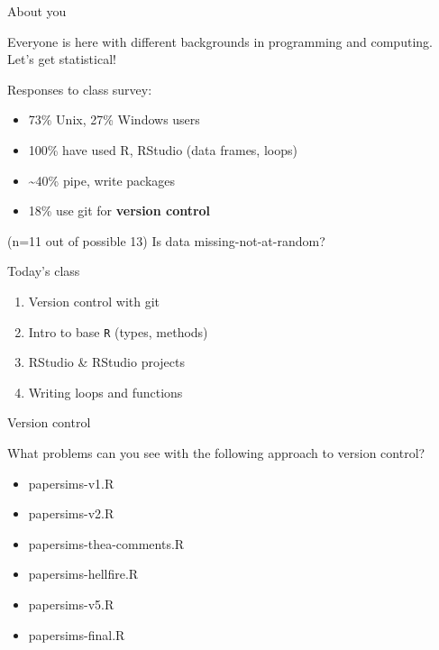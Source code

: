 \documentclass[ignorenonframetext,]{beamer}
\providecommand{\tightlist}{%
  \setlength{\itemsep}{0pt}\setlength{\parskip}{0pt}}
\begin{document}
\begin{frame}{About you}
\protect\hypertarget{about-you}{}

Everyone is here with different backgrounds in programming and
computing. Let's get statistical!

Responses to class survey:

\begin{itemize}
\tightlist
\item
  73\% Unix, 27\% Windows users
\item
  100\% have used R, RStudio (data frames, loops)
\item
  \textasciitilde{}40\% pipe, write packages
\item
  18\% use git for \textbf{version control}
\end{itemize}

(n=11 out of possible 13) Is data missing-not-at-random?

\end{frame}

\begin{frame}[fragile]{Today's class}
\protect\hypertarget{todays-class}{}

\begin{enumerate}
\tightlist
\item
  Version control with git
\item
  Intro to base \texttt{R} (types, methods)
\item
  RStudio \& RStudio projects
\item
  Writing loops and functions
\end{enumerate}

\end{frame}

\begin{frame}{Version control}
\protect\hypertarget{version-control}{}

What problems can you see with the following approach to version
control?

\begin{itemize}
\tightlist
\item
  papersims-v1.R
\item
  papersims-v2.R
\item
  papersims-thea-comments.R
\item
  papersims-hellfire.R
\item
  papersims-v5.R
\item
  papersims-final.R
\end{itemize}

\end{frame}
\end{document}
